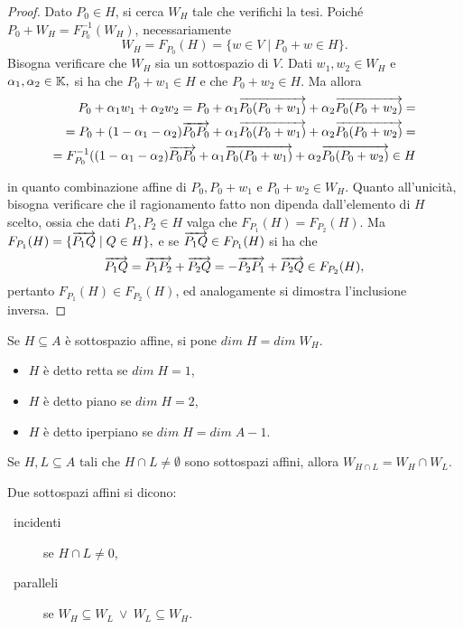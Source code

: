  \begin{proof}
 Dato $P_0\in H$, si cerca $W_H$ tale che verifichi la tesi.
 Poiché $P_0+W_H=F^{-1}_{P_0}(W_H)$, necessariamente
 \[
	W_H=F_{P_0}(H)=\{w\in V\;|\; P_0+w\in H\}.
 \]
 Bisogna verificare che $W_H$ sia un sottospazio di $V.$
 Dati $w_1,w_2\in W_H$ e $\alpha_1,\alpha_2\in \mathbb K,$ si ha che $P_0+w_1\in H$ e che
 $P_0+w_2\in H$. Ma allora
 \begin{eqnarray*}
	P_0+\alpha_1w_1+\alpha_2w_2=P_0+\alpha_1\overrightarrow{P_0(P_0+w_1)}+\alpha_2\overrightarrow{P_0(P_0+w_2)}=\\
	=P_0+(1-\alpha_1-\alpha_2)\overrightarrow{P_0P_0}+\alpha_1\overrightarrow{P_0(P_0+w_1)}+\alpha_2\overrightarrow{P_0(P_0+w_2)}=\\
	=F^{-1}_{P_0}((1-\alpha_1-\alpha_2)\overrightarrow{P_0P_0}+\alpha_1\overrightarrow{P_0(P_0+w_1)}+\alpha_2\overrightarrow{P_0(P_0+w_2)}\in H
 \end{eqnarray*}

 in quanto combinazione affine di $P_0,P_0+w_1$ e $P_0+w_2\in W_H$.
 Quanto all'unicità, bisogna verificare che il ragionamento fatto non dipenda dall'elemento di $H$ scelto, ossia che dati
 $P_1,P_2\in H$ valga che $F_{P_1}(H)=F_{P_2}(H)$.
 Ma $F_{P_1}(H)=\{\overrightarrow{P_1Q}\;|\; Q\in H\},$ e se $\overrightarrow{P_1Q}\in F_{P_1}(H)$ si ha che
 $$\overrightarrow{P_1Q}=\overrightarrow{P_1P_2}+\overrightarrow{P_2Q}=-\overrightarrow{P_2P_1}+\overrightarrow{P_2Q}\in F_{P_2}(H),$$
 pertanto $F_{P_1}(H)\in F_{P_2}(H)$, ed analogamente si dimostra l'inclusione inversa.
 \end{proof}
 
 \begin{definition}
 Se $H\subseteq A$ è sottospazio affine, si pone $dim\;H=dim\;W_{H}$.
 \begin{itemize}
	\item $H$ è detto retta se $dim\;H = 1$,
	\item $H$ è detto piano se $dim\;H = 2$,
	\item $H$ è detto iperpiano se $dim\;H = dim\;A-1$.
 \end{itemize}
 \end{definition}
 
 \begin{remark}
 Se $H, L \subseteq A \text{ tali che } H\cap L \neq \emptyset$ sono sottospazi affini, allora
 $W_{H\cap L}=W_H\cap W_L$.
 \end{remark}
 
 \begin{definition}
 Due sottospazi affini si dicono:
 \begin{description}
	\item[\textbullet\ incidenti] se $H\cap L \neq 0$,
	\item[\textbullet\ paralleli] se $W_H\subseteq W_L\ \vee\ W_L\subseteq W_H$.
 \end{description}
 \end{definition}
 
